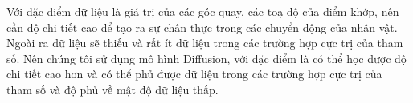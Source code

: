 


Với đặc điểm dữ liệu là giá trị của các góc quay, các toạ độ của điểm khớp, nên cần độ chi tiết cao để tạo ra sự chân thực trong các chuyển động của nhân vật. Ngoài ra dữ liệu sẽ thiếu và rất ít dữ liệu trong các trường hợp cực trị của tham số.
Nên chúng tôi sử dụng mô hình Diffusion, với đặc điểm là có thể học được độ chi tiết cao hơn và có thể phủ được dữ liệu trong các trường hợp cực trị của tham số và độ phủ về mật độ dữ liệu thấp.

%

